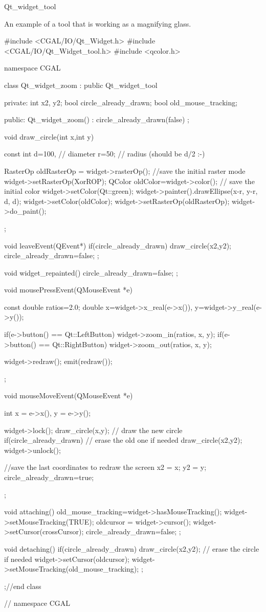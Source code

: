 \begin{ccRefClass}{Qt_widget_tool}
\ccExample

An example of a tool that is working as a magnifying glass.

\begin{ccExampleCode}
#include <CGAL/IO/Qt_Widget.h>
#include <CGAL/IO/Qt_Widget_tool.h>
#include <qcolor.h>

namespace CGAL {

class Qt_widget_zoom : public Qt_widget_tool
{
private:
        int  x2, y2;
        bool circle_already_drawn;
        bool old_mouse_tracking;

public:
  Qt_widget_zoom() : circle_already_drawn(false) {};

  void draw_circle(int x,int y)
  {
    const int
    d=100, // diameter
    r=50;  // radius (should be d/2 :-)

    RasterOp oldRasterOp = widget->rasterOp();  //save the initial raster mode
    widget->setRasterOp(XorROP);
    QColor oldColor=widget->color(); // save the initial color
    widget->setColor(Qt::green);
    widget->painter().drawEllipse(x-r, y-r, d, d);
    widget->setColor(oldColor);
    widget->setRasterOp(oldRasterOp);
    widget->do_paint();
  };

  void leaveEvent(QEvent*)
  {
    if(circle_already_drawn)
      draw_circle(x2,y2);
    circle_already_drawn=false;
  };

  void widget_repainted(){
    circle_already_drawn=false;
  };

  void mousePressEvent(QMouseEvent *e)
  {
    const double ratios=2.0;
    double
      x=widget->x_real(e->x()),
      y=widget->y_real(e->y());
                
    if(e->button() == Qt::LeftButton)
      widget->zoom_in(ratios, x, y);
    if(e->button() == Qt::RightButton)
      widget->zoom_out(ratios, x, y);
                
    widget->redraw();
    emit(redraw()); 
  };

  void mouseMoveEvent(QMouseEvent *e)
  {
    int
      x = e->x(),
      y = e->y();

    widget->lock();
    draw_circle(x,y); // draw the new circle
    if(circle_already_drawn) // erase the old one if needed
        draw_circle(x2,y2);
    widget->unlock();
                
    //save the last coordinates to redraw the screen
    x2 = x;
    y2 = y;
    circle_already_drawn=true;
  };

  void attaching()
  {
    old_mouse_tracking=widget->hasMouseTracking();
    widget->setMouseTracking(TRUE);
    oldcursor = widget->cursor();
    widget->setCursor(crossCursor);
    circle_already_drawn=false;
  };

  void detaching()
  {
    if(circle_already_drawn)
      draw_circle(x2,y2); // erase the circle if needed
    widget->setCursor(oldcursor);
    widget->setMouseTracking(old_mouse_tracking);
  };
};//end class 

} // namespace CGAL
\end{ccExampleCode}

\end{ccRefClass}








